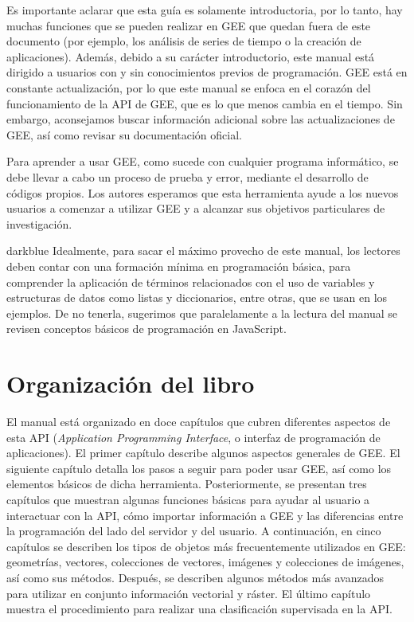 \documentclass[
  12pt,
  letterpaper,
  twoside]{book}
\begin{document}
Es importante aclarar que esta guía es solamente introductoria, por lo tanto, hay muchas funciones que se pueden realizar en GEE que quedan fuera de este documento (por ejemplo, los análisis de series de tiempo o la creación de aplicaciones). Además, debido a su carácter introductorio, este manual está dirigido a usuarios con y sin conocimientos previos de programación. GEE está en constante actualización, por lo que este manual se enfoca en el corazón del funcionamiento de la API de GEE, que es lo que menos cambia en el tiempo. Sin embargo, aconsejamos buscar información adicional sobre las actualizaciones de GEE, así como revisar su documentación oficial.

Para aprender a usar GEE, como sucede con cualquier programa informático, se debe llevar a cabo un proceso de prueba y error, mediante el desarrollo de códigos propios. Los autores esperamos que esta herramienta ayude a los nuevos usuarios a comenzar a utilizar GEE y a alcanzar sus objetivos particulares de investigación.

\begin{bluebox2}

\begin{awesomeblock}{5pt}{\faLightbulb}{darkblue}
Idealmente, para sacar el máximo provecho de este manual, los lectores deben contar con una formación mínima en programación básica, para comprender la aplicación de términos relacionados con el uso de variables y estructuras de datos como listas y diccionarios, entre otras, que se usan en los ejemplos. De no tenerla, sugerimos que paralelamente a la lectura del manual se revisen conceptos básicos de programación en JavaScript.

\end{awesomeblock}

\end{bluebox2}

\hypertarget{organizaciuxf3n-del-libro}{%
\section{Organización del libro}\label{organizaciuxf3n-del-libro}}

El manual está organizado en doce capítulos que cubren diferentes aspectos de esta API (\emph{Application Programming Interface}, o interfaz de programación de aplicaciones). El primer capítulo describe algunos aspectos generales de GEE. El siguiente capítulo detalla los pasos a seguir para poder usar GEE, así como los elementos básicos de dicha herramienta. Posteriormente, se presentan tres capítulos que muestran algunas funciones básicas para ayudar al usuario a interactuar con la API, cómo importar información a GEE y las diferencias entre la programación del lado del servidor y del usuario. A continuación, en cinco capítulos se describen los tipos de objetos más frecuentemente utilizados en GEE: geometrías, vectores, colecciones de vectores, imágenes y colecciones de imágenes, así como sus métodos. Después, se describen algunos métodos más avanzados para utilizar en conjunto información vectorial y ráster. El último capítulo muestra el procedimiento para realizar una clasificación supervisada en la API.
\end{document}
